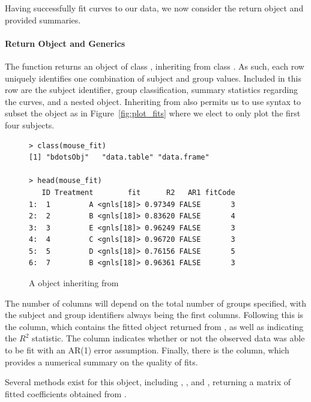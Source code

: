 Having successfully fit curves to our data, we now consider the return object and provided summaries. 


\paragraph{Return Object and Generics}

The function  returns an object of class , inheriting from class . As such, each row uniquely identifies one combination of subject and group values. Included in this row are the subject identifier, group classification, summary statistics regarding the curves, and a nested  object. Inheriting from  also permits us to use  syntax to subset the object as in Figure~\ref{fig:plot_fits}  where we elect to only plot the first four subjects.

\begin{singlespace}
\begin{figure}[H]
\centering
\begin{BVerbatim}
> class(mouse_fit)
[1] "bdotsObj"   "data.table" "data.frame"

> head(mouse_fit)
   ID Treatment        fit      R2   AR1 fitCode
1:  1         A <gnls[18]> 0.97349 FALSE       3
2:  2         B <gnls[18]> 0.83620 FALSE       4
3:  3         E <gnls[18]> 0.96249 FALSE       3
4:  4         C <gnls[18]> 0.96720 FALSE       3
5:  5         D <gnls[18]> 0.76156 FALSE       5
6:  7         B <gnls[18]> 0.96361 FALSE       3
\end{BVerbatim}
\caption{A  object inheriting from }
\label{fig:bdotsObj}
\end{figure}
\end{singlespace}

The number of columns will depend on the total number of groups specified, with the subject and group identifiers always being the first columns. Following this is the  column, which contains the fitted object returned from , as well as  indicating the $R^2$ statistic. The  column indicates whether or not the observed data was able to be fit with an AR(1) error assumption. Finally, there is the  column, which provides a numerical summary on the quality of fits.

Several methods exist for this object, including , , and , returning a matrix of fitted coefficients obtained from . 


